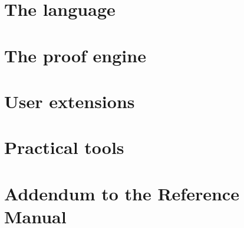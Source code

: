 \documentclass[11pt,a4paper]{book}
\begin{document}
\sloppy{}

\tophtml{}


\tableofcontents

\part{The language}


\part{The proof engine}

\part{User extensions}

\part{Practical tools}

\part{Addendum to the Reference Manual}
%
%
%
%
%
\nocite{*}


\end{document}
